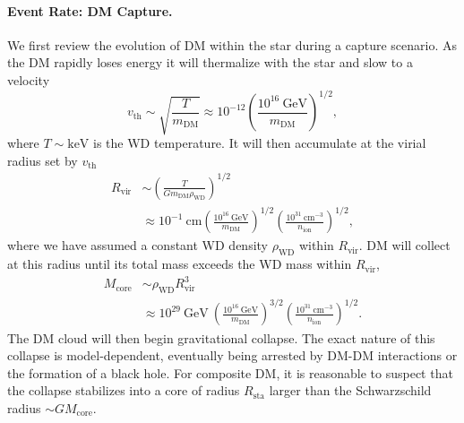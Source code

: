 \documentclass[twocolumn, preprintnumbers,amsmath,amssymb,prd, superscriptaddress]{revtex4}
\newcommand{\GeV}{\text{GeV}}
\newcommand{\keV}{\text{keV}}
\newcommand{\cm}{\text{cm}}
\def\r{\right)}
\def\l{\left(}
\begin{document}
\paragraph{Event Rate: DM Capture.}
We first review the evolution of DM within the star during a capture scenario.
As the DM rapidly loses energy it will thermalize with the star and slow to a velocity
\begin{equation}
v_\text{th} \sim \sqrt{\frac{T}{m_\text{DM}}} \approx 10^{-12} \l \frac{10^{16} ~\GeV}{m_\text{DM}}\r^{1/2},
\end{equation}
where $T \sim \keV$ is the WD temperature.
It will then accumulate at the virial radius set by $v_\text{th}$
\begin{align}
  R_\text{vir} &\sim \l \frac{T}{G m_\text{DM} \rho_\text{WD}}\r^{1/2} \\
  &\approx 10^{-1} ~\text{cm} \l \frac{10^{16} ~\GeV}{m_\text{DM}}\r^{1/2}
  \l \frac{10^{31} ~\cm^{-3}}{n_\text{ion}}\r^{1/2}, \nonumber
\end{align}
where we have assumed a constant WD density $\rho_\text{WD}$ within $R_\text{vir}$.
DM will collect at this radius until its total mass exceeds the WD mass within $R_\text{vir}$,
\begin{align}
    M_\text{core} &\sim \rho_\text{WD} R^3_\text{vir} \\
    &\approx 10^{29}~\GeV ~\l \frac{10^{16} ~\GeV}{m_\text{DM}}\r^{3/2}
  \l \frac{10^{31} ~\cm^{-3}}{n_\text{ion}}\r^{1/2}. \nonumber
\end{align}
The DM cloud will then begin gravitational collapse.
The exact nature of this collapse is model-dependent, eventually being arrested by DM-DM interactions or the formation of a black hole.
For composite DM, it is reasonable to suspect that the collapse stabilizes into a core of radius $R_\text{sta}$ larger than the Schwarzschild radius $\sim G M_\text{core}$.
\end{document}

